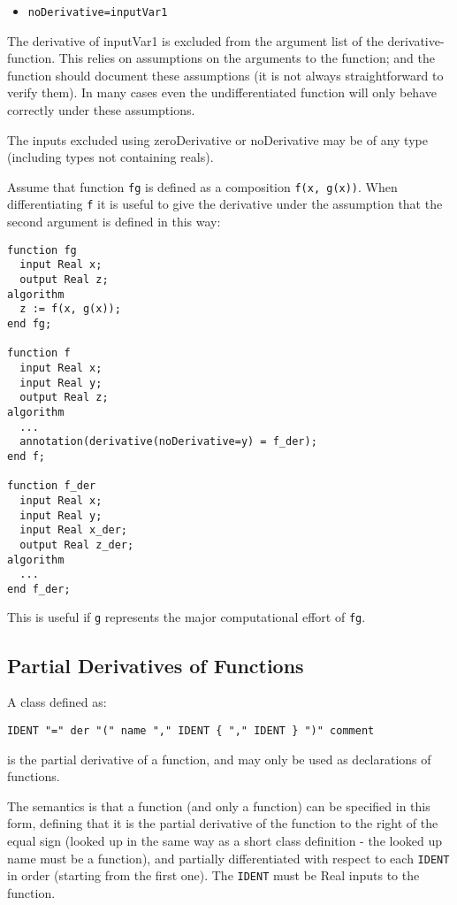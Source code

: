 \begin{itemize}
\item
  \lstinline!noDerivative=inputVar1!
\end{itemize}

The derivative of inputVar1 is excluded from the argument list of the
derivative-function. This relies on assumptions on the arguments to the
function; and the function should document these assumptions (it is not
always straightforward to verify them). In many cases even the
undifferentiated function will only behave correctly under these
assumptions.

The inputs excluded using zeroDerivative or noDerivative may be of any
type (including types not containing reals).

\begin{nonnormative}
Assume that function \lstinline!fg! is defined as a composition \lstinline!f(x, g(x))!.
When differentiating \lstinline!f! it is useful to give the derivative under the
assumption that the second argument is defined in this way:
\begin{lstlisting}[language=modelica]
function fg
  input Real x;
  output Real z;
algorithm
  z := f(x, g(x));
end fg;

function f
  input Real x;
  input Real y;
  output Real z;
algorithm
  ...
  annotation(derivative(noDerivative=y) = f_der);
end f;

function f_der
  input Real x;
  input Real y;
  input Real x_der;
  output Real z_der;
algorithm
  ...
end f_der;
\end{lstlisting}
This is useful if \lstinline!g! represents the major computational
effort of \lstinline!fg!.
\end{nonnormative}

\subsection{Partial Derivatives of Functions}

A class defined as:
\begin{lstlisting}[language=grammar]
IDENT "=" der "(" name "," IDENT { "," IDENT } ")" comment
\end{lstlisting}

is the partial derivative of a function, and may only be used as
declarations of functions.

The semantics is that a function (and only a function) can be
specified in this form, defining that it is the partial derivative of
the function to the right of the equal sign (looked up in the same way
as a short class definition - the looked up name must be a function),
and partially differentiated with respect to each \lstinline!IDENT! in order
(starting from the first one). The \lstinline!IDENT! must be Real inputs to the
function.

